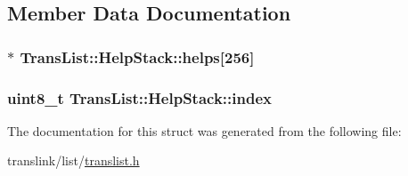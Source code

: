 \subsection{Member Data Documentation}
\hypertarget{structTransList_1_1HelpStack_a82ad637822f4d1352de8068aec3aa866}{
\subsubsection[{helps}]{$\ast$ Trans\-List\-::\-Help\-Stack\-::helps\mbox{[}256\mbox{]}}}\label{structTransList_1_1HelpStack_a82ad637822f4d1352de8068aec3aa866}
\hypertarget{structTransList_1_1HelpStack_a57a5bf227d204748806553f0383bd823}{
\subsubsection[{index}]{\setlength{\rightskip}{0pt plus 5cm}uint8\-\_\-t Trans\-List\-::\-Help\-Stack\-::index}}\label{structTransList_1_1HelpStack_a57a5bf227d204748806553f0383bd823}


The documentation for this struct was generated from the following file\-:\begin{DoxyCompactItemize}
\item 
translink/list/\hyperlink{translist_8h}{translist.\-h}\end{DoxyCompactItemize}
